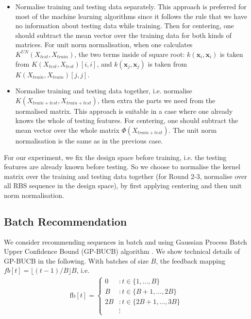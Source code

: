\begin{itemize}
    \item Normalise training and testing data separately.
    This approach is preferred for most of the machine learning algorithms since it follows the rule that we have no information about testing data while training.
    Then for centering, one should subtract the mean vector over the training data for both kinds of matrices.
    For unit norm normalisation, when one calculates $K^{UN}(X_{test}, X_{train})$, the two terms inside of square root: $k(\mathbf{x}_i, \mathbf{x}_i)$ is taken from $K(X_{test}, X_{test})[i,i]$, and $k(\mathbf{x}_j, \mathbf{x}_j)$ is taken from $K(X_{train}, X_{train})[j,j]$.
    
    \item Normalise training and testing data together, i.e. normalise $K(X_{train+test}, X_{train+test})$, then extra the parts we need from the normalised matrix. 
    This approach is suitable in a case where one already knows the whole of testing features. 
    For centering, one should subtract the mean vector over the whole matrix $\Phi(X_{train+test})$. 
    The unit norm normalisation is the same as in the previous case. 
\end{itemize}

For our experiment, we fix the design space before training, i.e. the testing features are already known before testing. 
So we choose to normalise the kernel matrix over the training and testing data together (for Round 2-3, normalise over all RBS sequence in the design space),
by first applying centering and then unit norm normalisation. 

\subsection{Batch Recommendation}

We consider recommending sequences in batch and using Gaussian Process Batch Upper Confidence Bound (GP-BUCB) algorithm  \cite{desautels2014parallelizing}.
We show technical details of GP-BUCB in the following.
With batches of size $B$, the feedback mapping $fb[t] = \lfloor(t-1) / B\rfloor B$, i.e. 
\begin{align}
    \mathrm{fb}[t]=\left\{\begin{array}{cl}
    0 & : t \in\{1, \ldots, B\} \\
    B & : t \in\{B+1, \ldots, 2 B\} \\
    2 B & : t \in\{2 B+1, \ldots, 3 B\} \\
    & \vdots
    \end{array}\right.
\end{align}


